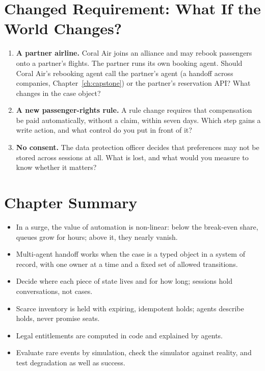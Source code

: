 \section{Changed Requirement: What If the World Changes?}
\label{sec:air-changed}

\begin{enumerate}[itemsep=3pt]
  \item \textbf{A partner airline.} Coral Air joins an alliance and may rebook passengers onto a partner's flights. The partner runs its own booking agent. Should Coral Air's rebooking agent call the partner's agent (a handoff across companies, Chapter~\ref{ch:capstone}) or the partner's reservation API? What changes in the case object?
  \item \textbf{A new passenger-rights rule.} A rule change requires that compensation be paid automatically, without a claim, within seven days. Which step gains a write action, and what control do you put in front of it?
  \item \textbf{No consent.} The data protection officer decides that preferences may not be stored across sessions at all. What is lost, and what would you measure to know whether it matters?
\end{enumerate}

\section*{Chapter Summary}

\begin{itemize}[itemsep=2pt]
  \item In a surge, the value of automation is non-linear: below the break-even share, queues grow for hours; above it, they nearly vanish.
  \item Multi-agent handoff works when the case is a typed object in a system of record, with one owner at a time and a fixed set of allowed transitions.
  \item Decide where each piece of state lives and for how long; sessions hold conversations, not cases.
  \item Scarce inventory is held with expiring, idempotent holds; agents describe holds, never promise seats.
  \item Legal entitlements are computed in code and explained by agents.
  \item Evaluate rare events by simulation, check the simulator against reality, and test degradation as well as success.
\end{itemize}

